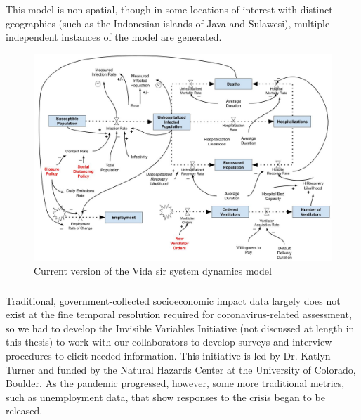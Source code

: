 This model is non-spatial, though in some locations of interest with distinct geographies (such as the Indonesian islands of Java and Sulawesi), multiple independent instances of the model are generated.

\begin{figure}[h]
	\centering
	\includegraphics[scale=0.25]{Figures/chap5/SD_diagram.jpg}
	\caption[Current version of the Vida SIR system dynamics model]{Current version of the Vida \ac{sir} system dynamics model}
	\label{fig:vida_sd}
\end{figure}


\subsubsection{}

Traditional, government-collected socioeconomic impact data largely does not exist at the fine temporal resolution required for coronavirus-related assessment, so we had to develop the Invisible Variables Initiative (not discussed at length in this thesis) to work with our collaborators to develop surveys and interview procedures to elicit needed information. This initiative is led by Dr. Katlyn Turner and funded by the Natural Hazards Center at the University of Colorado, Boulder. As the pandemic progressed, however, some more traditional metrics, such as unemployment data, that show responses to the crisis began to be released.

